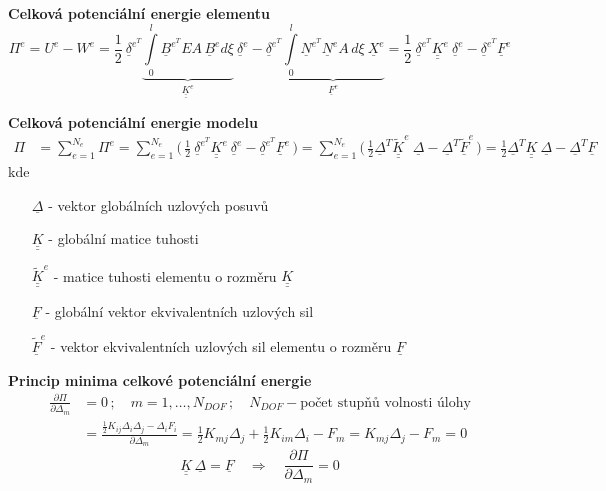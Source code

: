 \documentclass[10pt,oneside]{article}
\newcommand{\ul}[1]{\underline{#1}}
\newcommand{\ull}[1]{\underline{\underline{#1}}}
\begin{document}
\textbf{Celková potenciální energie elementu}
\begin{equation*}
\Pi^e = U^e - W^e
	=  \frac{1}{2}\ \ul{\delta}^{e^T} \underbrace{\int\limits_0^l \ul{B}^{e^T}\!E A\,\ul{B}^e d\xi}_{\ull{K}^e}\ \ul{\delta}^e
	- \ul{\delta}^{e^T} \underbrace{\int\limits_0^l \ul{N}^{e^T} \ul{N}^e A\,d\xi\ \ul{X}^e}_{\ul{F}^e}
	= \frac{1}{2}\ \ul{\delta}^{e^T}\!\ull{K}^e\ \ul{\delta}^e - \ul{\delta}^{e^T} \ul{F}^e
\end{equation*}

\textbf{Celková potenciální energie modelu}
\begin{equation*}
	\begin{aligned}
		\Pi &= \sum\limits_{e=1}^{N_e} \Pi^e
			= \sum\limits_{e=1}^{N_e} \bigg(\, \frac{1}{2}\ \ul{\delta}^{e^T}\!\ull{K}^e\ \ul{\delta}^e - \ul{\delta}^{e^T} \ul{F}^e \,\bigg)
			= \sum\limits_{e=1}^{N_e} \bigg(\, \frac{1}{2}\ul{\Delta}^T \ull{\tilde{K}}^e\ \ul{\Delta} - \ul{\Delta}^T \ul{\tilde{F}}^e \,\bigg)
			= \frac{1}{2}\ul{\Delta}^T \ull{K}\ \ul{\Delta} - \ul{\Delta}^T \ul{F} 
	\end{aligned}
\end{equation*}
%
kde
%
\begin{multicols}{2}
	\begin{itemize}
		\item [$\ul{\Delta}$] - vektor globálních uzlových posuvů
		\\[-.5em]
		\item [$\ull{K}$] - globální matice tuhosti
		\item [$\ull{\tilde{K}}^e$] - matice tuhosti elementu o rozměru $\ull{K}$
		\\[.5em]
		\item [$\ul{F}$] - globální vektor ekvivalentních uzlových sil
		\item [$\ul{\tilde{F}}^e$] - vektor ekvivalentních uzlových sil elementu o rozměru $\ul{F}$
	\end{itemize}
\end{multicols}

\textbf{Princip minima celkové potenciální energie}
\begin{equation*}
	\begin{aligned}
		\frac{\partial \Pi}{\partial \Delta_m} &= 0 \,;\quad m = 1,\dots,N_{DOF} \,;\quad N_{DOF} - \text{počet stupňů volnosti úlohy} \\
		&= \frac{\frac{1}{2} K_{ij} \Delta_i \Delta_j - \Delta_i F_i}{\partial \Delta_m} = \frac{1}{2} K_{mj} \Delta_j + \frac{1}{2} K_{im} \Delta_i - F_m = K_{mj} \Delta_j - F_m = 0
	\end{aligned}
\end{equation*}
%
\begin{equation*}
	\ull{K}\,\ul{\Delta} = \ul{F} \quad \Rightarrow \quad \frac{\partial \Pi}{\partial \Delta_m} = 0
\end{equation*}
\end{document}

